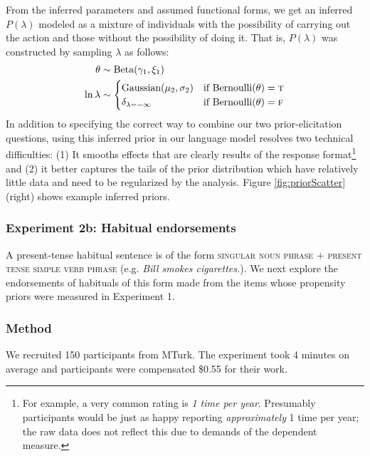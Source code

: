 \documentclass[11pt,letterpaper]{article}
\begin{document}
From the inferred parameters and assumed functional forms, we get an inferred $P(\lambda)$ modeled as a mixture of individuals with the possibility of carrying out the action and those without the possibility of doing it. 
That is, $P(\lambda)$ was constructed by sampling $\lambda$ as follows:
\begin{align}
\theta & \sim \text{Beta}(\gamma_{1}, \xi_{1}) \nonumber \\ 
\ln \lambda & \sim \begin{cases}
		\text{Gaussian}(\mu_{2}, \sigma_{2}) &\mbox{if } \text{Bernoulli}(\theta) = \textsc{t} \label{eq:priorModel}  \\
				\delta_{\lambda=-\infty} &\mbox{if } \text{Bernoulli}(\theta) = \textsc{f} \\
		\end{cases}
\end{align}
In addition to specifying the correct way to combine our two prior-elicitation questions, using this inferred prior in our language model resolves two technical difficulties: (1) It smooths effects that are clearly results of the response format\footnote{For example, a very common rating is \emph{1 time per year}. Presumably participants would be just as happy reporting \emph{approximately} 1 time per year; the raw data does not reflect this due to demands of the dependent measure.} 
and (2) it better captures the tails of the prior distribution which have relatively little data and need to be regularized by the analysis.
Figure \ref{fig:priorScatter} (right) shows example inferred priors.




\subsubsection*{Experiment 2b: Habitual endorsements}

A present-tense habitual sentence is of the form \textsc{singular noun phrase} $+$ \textsc{present tense simple verb phrase} (e.g. \emph{Bill smokes cigarettes.}).  
We next explore the endorsements of habituals of this form made from the items whose propensity priors were measured in Experiment 1. 

\subsubsection*{Method}


We recruited 150 participants from MTurk. 
The experiment took 4 minutes on average and participants were compensated \$0.55 for their work.
\end{document}
